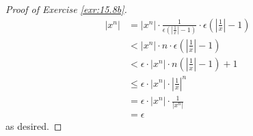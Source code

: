 \documentclass[../main.tex]{subfiles}
\begin{document}
\begin{exercise}
\begin{enumerate}[label={(\alph*)},ref={\theexercise\alph*}]
\begin{proof}[Proof of Exercise \ref{exr:15.8b}]
            \begingroup
            \allowdisplaybreaks
            \begin{align*}
                |x^n| &= |x^n|\cdot\frac{1}{\epsilon\left( \left| \frac{1}{x} \right|-1 \right)}\cdot\epsilon\left( \left| \tfrac{1}{x} \right|-1 \right)\\
                &< |x^n|\cdot n\cdot\epsilon\left( \left| \tfrac{1}{x} \right|-1 \right)\\
                &< \epsilon\cdot|x^n|\cdot n\left( \left| \tfrac{1}{x} \right|-1 \right)+1\\
                &\leq \epsilon\cdot|x^n|\cdot\left| \tfrac{1}{x} \right|^n\\
                &= \epsilon\cdot|x^n|\cdot\frac{1}{|x^n|}\\
                &= \epsilon
            \end{align*}
            \endgroup
            as desired.
        \end{proof}
    \end{enumerate}
\end{exercise}
\end{document}
